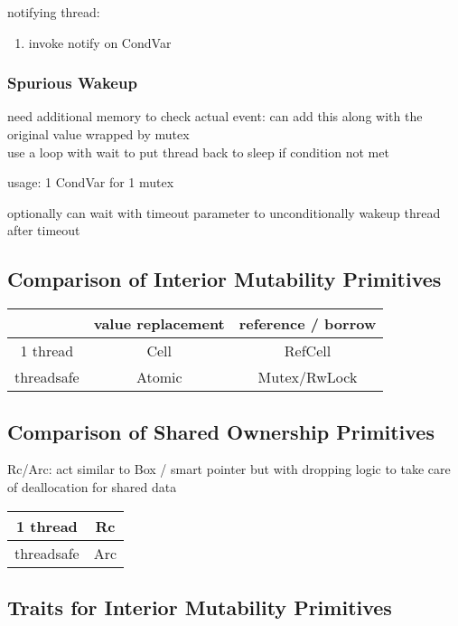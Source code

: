 \documentclass[8pt]{extarticle}
\begin{document}
\begin{multicols*}{2}
  notifying thread:
  \begin{enumerate}
  \item invoke notify on CondVar
  \end{enumerate}
  
  \subsubsection{Spurious Wakeup}
  need additional memory to check actual event: can add this along with the original value wrapped by mutex\\
  use a loop with wait to put thread back to sleep if condition not met
  
  usage: 1 CondVar for 1 mutex

  optionally can wait with timeout parameter to unconditionally wakeup thread after timeout

  \subsection{Comparison of Interior Mutability Primitives}
  \begin{tabular}{| c | c | c |}
    \hline
    & value replacement & reference / borrow \\
    \hline
    1  thread & Cell & RefCell \\
    \hline
    threadsafe & Atomic & Mutex/RwLock \\
    \hline
  \end{tabular}

  \subsection{Comparison of Shared Ownership Primitives}
  Rc/Arc: act similar to Box / smart pointer but with dropping logic to take care of deallocation for shared data\\
  
  \begin{tabular}{| c | c |}
    \hline
    1  thread & Rc \\
    \hline
    threadsafe & Arc \\
    \hline
  \end{tabular}
  
  \subsection{Traits for Interior Mutability Primitives}


\end{multicols*}
\end{document}

